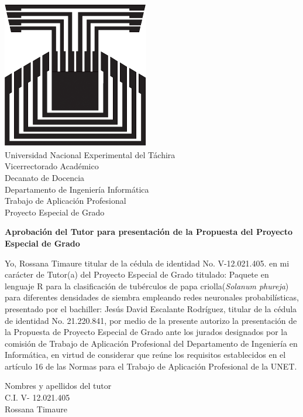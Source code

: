 \chapter*{}
\pagestyle{empty}
\thispagestyle{empty}


\begin{center}
\includegraphics[scale=0.2]{unet.jpg}\\

Universidad Nacional Experimental del T\'achira\\

Vicerrectorado Acad\'emico\\

Decanato de Docencia\\

Departamento de Ingenier\'ia Inform\'atica\\

Trabajo de Aplicaci\'on Profesional\\

Proyecto Especial de Grado\\

\end{center}

\begin{center}
\textbf{Aprobaci\'on del Tutor para presentaci\'on de la Propuesta del Proyecto Especial de Grado}
\end{center}

	Yo,  Rossana Timaure  titular de la c\'edula de identidad No. V-12.021.405.  en mi car\'acter de Tutor(a) del Proyecto Especial de Grado titulado: Paquete en lenguaje R para la clasificaci\'on de tub\'erculos de papa criolla(\textit{Solanum phureja}) para diferentes densidades de siembra empleando redes neuronales probabil\'isticas, presentado por el bachiller: Jes\'us David Escalante Rodr\'iguez, titular de la c\'edula de identidad No. 21.220.841, por medio de la presente autorizo la presentaci\'on de la Propuesta de Proyecto Especial de Grado ante los jurados designados por la comisi\'on de Trabajo de Aplicaci\'on Profesional del Departamento de Ingenier\'ia en Inform\'atica, en virtud de considerar que re\'une los requisitos establecidos en el art\'iculo 16 de las Normas para el Trabajo de Aplicaci\'on Profesional de la UNET.\\
	
	
	\begin{center}
	Nombres y apellidos del tutor\\
	
	C.I. V- 12.021.405\\
Rossana Timaure\\
	\end{center}